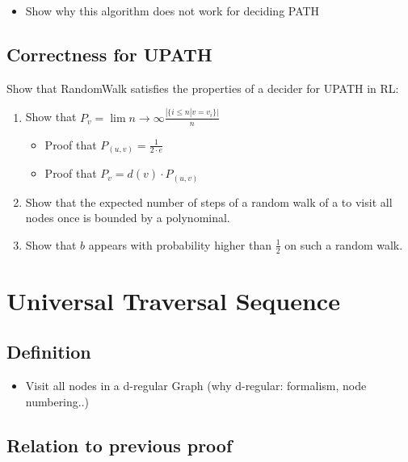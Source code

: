 \begin{itemize}
\itemsep1pt\parskip0pt
\item
  Show why this algorithm does not work for deciding PATH
\end{itemize}

\section{Correctness for UPATH}\label{correctness-for-upath}

Show that RandomWalk satisfies the properties of a decider for UPATH in
RL:

\begin{enumerate}
\def\labelenumi{\arabic{enumi}.}
\item
  Show that
  $P_v = \lim{n \longrightarrow \infty} \frac{|\{i \leq n | v = v_i\}|}{n}$

  \begin{itemize}
  \itemsep1pt\parskip0pt
  \item
    Proof that $P_{(u, v)} = \frac{1}{2 \cdot e}$
  \item
    Proof that $P_v = d(v) \cdot P_{(u, v)}$
  \end{itemize}
\item
  Show that the expected number of steps of a random walk of a to visit
  all nodes once is bounded by a polynominal.
\item
  Show that $b$ appears with probability higher than $\frac{1}{2}$ on
  such a random walk.
\end{enumerate}

\chapter{Universal Traversal
Sequence}\label{universal-traversal-sequence}

\section{Definition}\label{definition-1}

\begin{itemize}
\itemsep1pt\parskip0pt
\item
  Visit all nodes in a d-regular Graph (why d-regular: formalism, node
  numbering..)
\end{itemize}

\section{Relation to previous proof}\label{relation-to-previous-proof}

